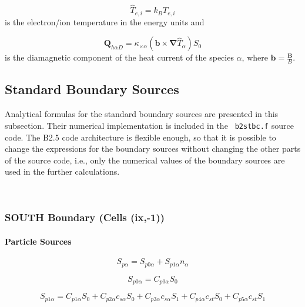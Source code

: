 \documentclass[11pt]{article}
\begin{document}
\begin{equation}
\widehat{T}_{e,i}=k_{B}T_{e,i}   \label{19}
\end{equation}
is the electron/ion temperature in the energy units and

\bigskip

\begin{equation}
\mathbf{Q}_{h\alpha D}=\kappa_{\times\alpha}\left( \mathbf{b\times\nabla }%
\widehat{T}_{\alpha}\right) S_{0}   \label{20}
\end{equation}
is the diamagnetic component of the heat current of the species $\alpha$,
where $\mathbf{b=}\frac{\mathbf{B}}{B}$.

\bigskip

\subsection{Standard Boundary Sources}

\bigskip

Analytical formulas for the standard boundary sources are presented in this
subsection. Their numerical implementation is included in the \texttt{%
b2stbc.f} source code. The B2.5 code architecture is flexible enough, so
that it is possible to change the expressions for the boundary sources
without changing the other parts of the source code, i.e., only the
numerical values of the boundary sources are used in the further
calculations.

\bigskip\ 

\subsubsection{SOUTH Boundary (Cells (ix,-1))}

\bigskip

\paragraph{Particle Sources}

\begin{equation}
S_{p\alpha}=S_{p0\alpha}+S_{p1\alpha}n_{\alpha}   \label{21}
\end{equation}

\begin{equation}
S_{p0\alpha}=C_{p0\alpha}S_{0}   \label{22}
\end{equation}

\begin{equation}
S_{p1\alpha}=C_{p1\alpha}S_{0}+C_{p2\alpha}c_{s\alpha}S_{0}+C_{p3\alpha
}c_{s\alpha}S_{1}+C_{p4\alpha}c_{st}S_{0}+C_{p5\alpha}c_{st}S_{1} 
\label{23}
\end{equation}
\end{document}
